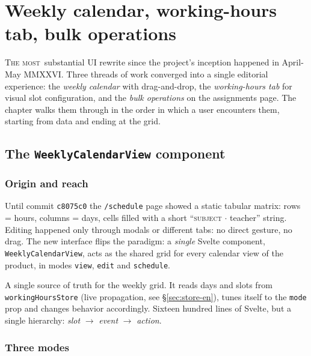 \chapter{Weekly calendar, working-hours tab, bulk operations}
\label{ch:calendario-ore-en}

\lettrine[lines=3]{T}{he most}\ substantial UI rewrite since the
project's inception happened in April-May MMXXVI. Three threads
of work converged into a single editorial experience: the
\emph{weekly calendar} with drag-and-drop, the \emph{working-hours
tab} for visual slot configuration, and the \emph{bulk
operations} on the assignments page. The chapter walks them
through in the order in which a user encounters them, starting
from data and ending at the grid.

\section{The \texttt{WeeklyCalendarView} component}

\subsection{Origin and reach}

Until commit \texttt{c8075c0} the \texttt{/schedule} page showed
a static tabular matrix: rows = hours, columns = days, cells
filled with a short ``\textsc{subject} $\cdot$ teacher'' string.
Editing happened only through modals or different tabs: no
direct gesture, no drag. The new interface flips the paradigm:
a \emph{single} Svelte component, \texttt{WeeklyCalendarView},
acts as the shared grid for every calendar view of the product,
in modes \texttt{view}, \texttt{edit} and \texttt{schedule}.

\begin{defbox}[title={The \texttt{WeeklyCalendarView.svelte} file}]
A single source of truth for the weekly grid. It reads days
and slots from \texttt{workingHoursStore} (live propagation,
see \S\ref{sec:store-en}), tunes itself to the
\texttt{mode} prop and changes behavior accordingly. Sixteen
hundred lines of Svelte, but a single hierarchy: \emph{slot}
${\rightarrow}$ \emph{event} ${\rightarrow}$ \emph{action}.
\end{defbox}

\subsection{Three modes}

